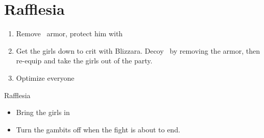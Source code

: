 \chapter{Rafflesia}

\begin{enumerate}
	\item Remove \vaan\ armor, protect him with \penelo
	\item Get the girls down to crit with Blizzara. Decoy \vaan\ by removing the armor, then re-equip and take the girls out of the party.
	\item Optimize everyone
\end{enumerate}
\begin{gambit}
	\begin{itemize}
	\end{itemize}
\end{gambit}
\begin{battle}{Rafflesia}
	\begin{itemize}
		\vaanf Run up
		\item Bring the girls in
		\item Turn the gambits off when the fight is about to end.
	\end{itemize}
\end{battle}